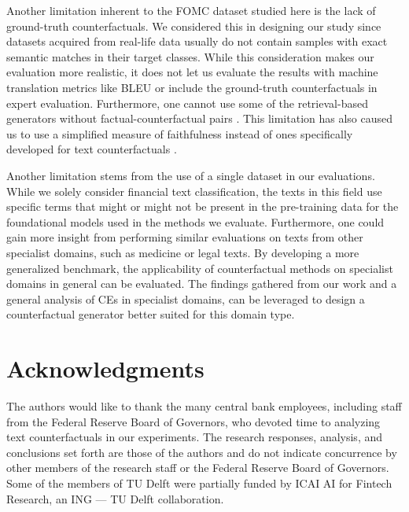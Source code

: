 \documentclass[11pt]{article}
\begin{document}

Another limitation inherent to the FOMC dataset studied here is the lack of ground-truth counterfactuals. We considered this in designing our study since datasets acquired from real-life data usually do not contain samples with exact semantic matches in their target classes. While this consideration makes our evaluation more realistic, it does not let us evaluate the results with machine translation metrics like BLEU or include the ground-truth counterfactuals in expert evaluation. Furthermore, one cannot use some of the retrieval-based generators without factual-counterfactual pairs \cite{dixit_core_2022}. This limitation has also caused us to use a simplified measure of faithfulness \cite{zheng_f-fidelity_2024} instead of ones specifically developed for text counterfactuals \cite{atanasova_faithfulness_2023}.

Another limitation stems from the use of a single dataset in our evaluations. While we solely consider financial text classification, the texts in this field use specific terms that might or might not be present in the pre-training data for the foundational models used in the methods we evaluate. Furthermore, one could gain more insight from performing similar evaluations on texts from other specialist domains, such as medicine or legal texts. By developing a more generalized benchmark, the applicability of counterfactual methods on specialist domains in general can be evaluated. The findings gathered from our work and a general analysis of CEs in specialist domains, can be leveraged to design a counterfactual generator better suited for this domain type.


\section*{Acknowledgments}
The authors would like to thank the many central bank employees, including staff from the Federal Reserve Board of Governors, who devoted time to analyzing text counterfactuals in our experiments. The research responses, analysis, and conclusions set forth are those of the authors and do not indicate concurrence by other members of the research staff or the Federal Reserve Board of Governors. Some of the members of TU Delft were partially funded by ICAI AI for Fintech Research, an ING — TU Delft collaboration.
\end{document}
